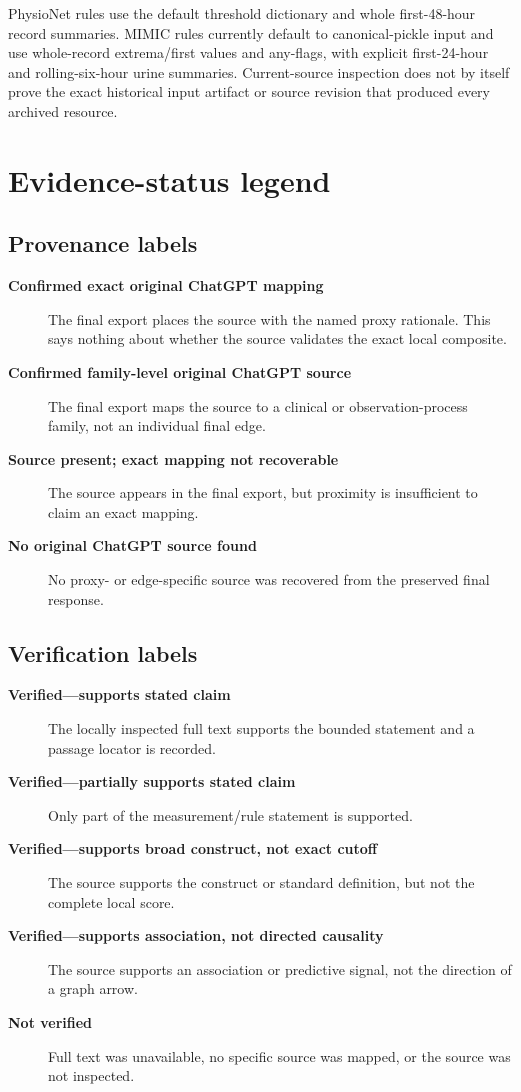 \documentclass[10pt]{article}
\newcommand{\status}[1]{\textbf{#1}}
\begin{document}
PhysioNet rules use the default threshold dictionary and whole first-48-hour record
summaries. MIMIC rules currently default to canonical-pickle input and use
whole-record extrema/first values and any-flags, with explicit first-24-hour and
rolling-six-hour urine summaries. Current-source inspection does not by itself prove
the exact historical input artifact or source revision that produced every archived
resource.

\section{Evidence-status legend}

\subsection*{Provenance labels}

\begin{description}
  \item[\status{Confirmed exact original ChatGPT mapping}] The final export places
  the source with the named proxy rationale. This says nothing about whether the
  source validates the exact local composite.
  \item[\status{Confirmed family-level original ChatGPT source}] The final export
  maps the source to a clinical or observation-process family, not an individual
  final edge.
  \item[\status{Source present; exact mapping not recoverable}] The source appears
  in the final export, but proximity is insufficient to claim an exact mapping.
  \item[\status{No original ChatGPT source found}] No proxy- or edge-specific source
  was recovered from the preserved final response.
\end{description}

\subsection*{Verification labels}

\begin{description}
  \item[\status{Verified---supports stated claim}] The locally inspected full text
  supports the bounded statement and a passage locator is recorded.
  \item[\status{Verified---partially supports stated claim}] Only part of the
  measurement/rule statement is supported.
  \item[\status{Verified---supports broad construct, not exact cutoff}] The source
  supports the construct or standard definition, but not the complete local score.
  \item[\status{Verified---supports association, not directed causality}] The source
  supports an association or predictive signal, not the direction of a graph arrow.
  \item[\status{Not verified}] Full text was unavailable, no specific source was
  mapped, or the source was not inspected.
\end{description}
\end{document}
